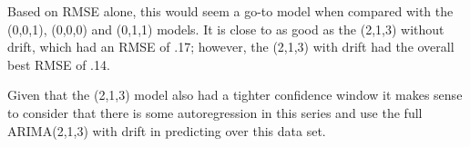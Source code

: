 \documentclass[openany]{book}
\begin{document}
Based on RMSE alone, this would seem a go-to model when compared with the (0,0,1), (0,0,0) and (0,1,1) models. It is close to as good as the (2,1,3) without drift, which had an RMSE of .17; however, the (2,1,3) with drift had the overall best RMSE of .14.

Given that the (2,1,3) model also had a tighter confidence window it makes sense to consider that there is some autoregression in this series and use the full ARIMA(2,1,3) with drift in predicting over this data set.


\end{document}
